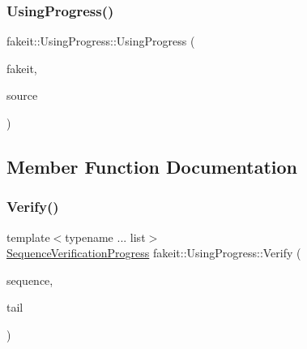 \mbox{\label{classfakeit_1_1UsingProgress_ac87db7ffa3ed53507cb2c98c2c0b4ee7}} 
\subsubsection{\texorpdfstring{UsingProgress()}{UsingProgress()}\hspace{0.1cm}{\footnotesize\ttfamily [9/9]}}
{\footnotesize\ttfamily fakeit\+::\+Using\+Progress\+::\+Using\+Progress (\begin{DoxyParamCaption}\item[{\mbox{\hyperlink{structfakeit_1_1FakeitContext}{fakeit\+::\+Fakeit\+Context}} \&}]{fakeit,  }\item[{\mbox{\hyperlink{structfakeit_1_1InvocationsSourceProxy}{Invocations\+Source\+Proxy}}}]{source }\end{DoxyParamCaption})\hspace{0.3cm}{\ttfamily [inline]}}



\subsection{Member Function Documentation}
\mbox{\label{classfakeit_1_1UsingProgress_a56c5d1ecdf4f405a4a85b348e1fad0f1}} 
\subsubsection{\texorpdfstring{Verify()}{Verify()}\hspace{0.1cm}{\footnotesize\ttfamily [1/9]}}
{\footnotesize\ttfamily template$<$typename ... list$>$ \\
\mbox{\hyperlink{classfakeit_1_1SequenceVerificationProgress}{Sequence\+Verification\+Progress}} fakeit\+::\+Using\+Progress\+::\+Verify (\begin{DoxyParamCaption}\item[{const \mbox{\hyperlink{classfakeit_1_1Sequence}{fakeit\+::\+Sequence}} \&}]{sequence,  }\item[{const list \&...}]{tail }\end{DoxyParamCaption})\hspace{0.3cm}{\ttfamily [inline]}}


